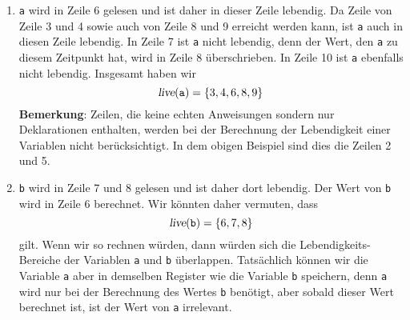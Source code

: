 \begin{enumerate}
\item \texttt{a} wird in Zeile 6 gelesen und ist daher in dieser Zeile lebendig.  
      Da Zeile von Zeile 3 und 4 sowie auch von Zeile 8 und 9
      erreicht werden kann, ist \texttt{a} auch in diesen Zeile lebendig.  In Zeile
      7 ist \texttt{a} nicht lebendig, denn der Wert, den \texttt{a} zu diesem Zeitpunkt
      hat, wird in Zeile 8 \"uberschrieben.  In Zeile 10 ist \texttt{a} ebenfalls nicht
      lebendig.  Insgesamt haben wir
      \[ \textsl{live}(\mathtt{a}) = \{ 3, 4, 6, 8, 9 \} \]
      \textbf{Bemerkung}:  Zeilen, die keine echten Anweisungen sondern nur Deklarationen
      enthalten, werden bei der Berechnung der Lebendigkeit einer Variablen nicht
      ber\"ucksichtigt.
      In dem obigen Beispiel sind dies die Zeilen 2 und 5.
\item \texttt{b} wird in Zeile 7 und 8 gelesen und ist daher dort lebendig.  Der Wert von
      \texttt{b} wird in Zeile 6 berechnet.  Wir k\"onnten daher vermuten, dass 
      \[ \textsl{live}(\mathtt{b}) = \{ 6, 7, 8 \} \]
      gilt.  Wenn wir so rechnen w\"urden, dann  w\"urden sich die Lebendigkeits-Bereiche
      der Variablen \texttt{a} und \texttt{b} \"uberlappen.  Tats\"achlich k\"onnen wir die
      Variable \texttt{a} aber in demselben Register wie die Variable \texttt{b}
      speichern, denn \texttt{a} wird nur bei der Berechnung des Wertes \texttt{b}
      ben\"otigt, aber sobald dieser Wert berechnet ist, ist der Wert von \texttt{a}
      irrelevant.


\end{enumerate}
